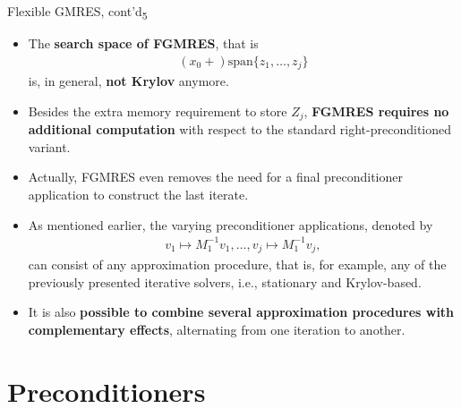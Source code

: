 \documentclass[t,usepdftitle=false]{beamer}
\begin{document}
\begin{frame}{Flexible GMRES, cont'd\textsubscript{5}}
\begin{itemize}
\item The \textbf{search space of FGMRES}, that is
\begin{align*}
(x_0+)\text{span}\{z_1,\dots,z_j\}
\end{align*}
is, in general, \textbf{not Krylov} anymore.
\item[] Besides the extra memory requirement to store $Z_j$, \textbf{FGMRES requires no additional computation} with respect to the standard right-preconditioned variant.
\item[]Actually, FGMRES even removes the need for a final preconditioner application to construct the last iterate.
\item As mentioned earlier, the varying preconditioner applications, denoted by 
\begin{align*}
v_1\mapsto M_1^{-1}v_1,\dots,v_j\mapsto M_1^{-1}v_j,
\end{align*}
can consist of any approximation procedure, that is, for example, any of the previously presented iterative solvers, i.e., stationary and Krylov-based.
\item[] It is also \textbf{possible to combine several approximation procedures with complementary effects}, alternating from one iteration to another.
\end{itemize}
\end{frame}

\section{Preconditioners}
\end{document}
